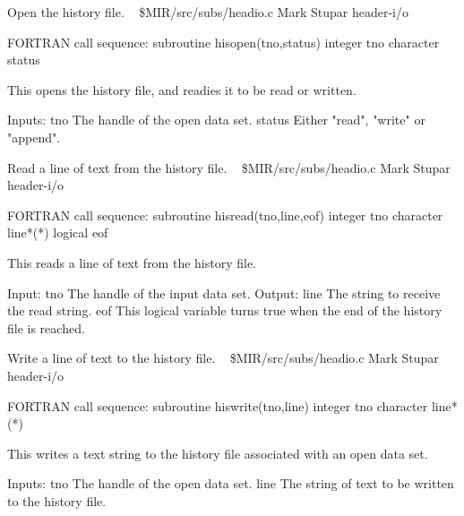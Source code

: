 %
\noindent Open the history file.
\newline \ 
\newline {} \$MIR/src/subs/headio.c
\newline {} Mark Stupar
\newline {} header-i/o
\par{\tenpoint
{\eightpoint\begintt
FORTRAN call sequence:
        subroutine hisopen(tno,status)
        integer tno
        character status

  This opens the history file, and readies it to be read or written.

  Inputs:
    tno         The handle of the open data set.
    status      Either "read", "write" or "append".                     
\endtt}
\par}
%
\noindent Read a line of text from the history file.
\newline \ 
\newline {} \$MIR/src/subs/headio.c
\newline {} Mark Stupar
\newline \abox{Keywords:} header-i/o
\par{\tenpoint
{\eightpoint\begintt
FORTRAN call sequence:
        subroutine hisread(tno,line,eof)
        integer tno
        character line*(*)
        logical eof

  This reads a line of text from the history file.

  Input:
    tno         The handle of the input data set.
  Output:
    line        The string to receive the read string.
    eof         This logical variable turns true when the end of the
                history file is reached.                                
\endtt}
\par}
%
\noindent Write a line of text to the history file.
\newline \ 
\newline {} \$MIR/src/subs/headio.c
\newline \abox{Responsible:} Mark Stupar
\newline {} header-i/o
\par{\tenpoint
{\eightpoint\begintt
FORTRAN call sequence:
        subroutine hiswrite(tno,line)
        integer tno
        character line*(*)

  This writes a text string to the history file associated with an open
  data set.

  Inputs:
    tno         The handle of the open data set.
    line        The string of text to be written to the history file.   
\endtt}
\par}
